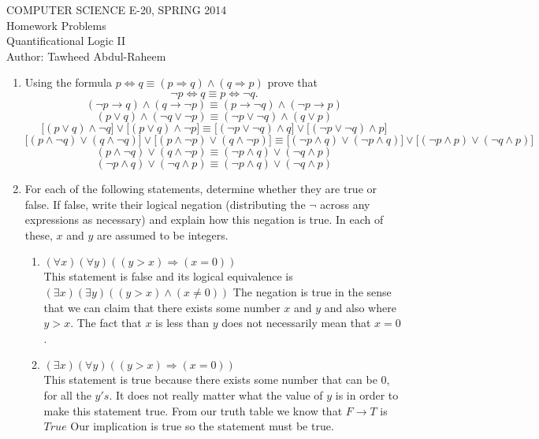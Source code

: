 \documentclass[12pt]{article}
\begin{document}
\begin{center}
COMPUTER SCIENCE E-20, SPRING 2014 \\
Homework Problems\\
Quantificational Logic II\\
Author: Tawheed Abdul-Raheem
\end{center}

\smallskip



\begin{enumerate}
\item Using the formula $p\Leftrightarrow q \equiv (p\Rightarrow q)\land (q\Rightarrow p)$ prove that $$\lnot p \Leftrightarrow q\equiv p\Leftrightarrow \lnot q.$$
        \[( \neg p \rightarrow q) \wedge (q \rightarrow \neg p) \equiv (p \rightarrow \neg q) \wedge (\neg p \rightarrow p) \]
        \[(p \vee q) \wedge (\neg q \vee \neg p) \equiv (\neg p \vee \neg q) \wedge (q \vee p) \]
        \[ \Big[ ( p \vee q) \wedge  \neg q \Big] \vee \Big[ (p \vee q) \wedge \neg p \Big] \equiv \Big[ (\neg p \vee \neg q) \wedge q \Big] \vee \Big[ (\neg p \vee \neg q) \wedge p \Big] \]
        \[ \Big[ ( p \wedge \neg q) \vee (q \wedge \neg q) \Big] \vee \Big[ (p \wedge \neg p) \vee (q \wedge \neg p) \Big] \equiv \Big[ (\neg p \wedge q) \vee (\neg p \wedge q) \Big] \vee \Big[ (\neg p \wedge p) \vee (\neg q \wedge p) \Big] \]
        \[(p \wedge \neg q) \vee (q \wedge \neg p) \equiv (\neg p \wedge q) \vee (\neg q \wedge p) \]
        \[(\neg p \wedge q) \vee (\neg q \wedge p)\equiv (\neg p \wedge q) \vee (\neg q \wedge p) \]
\item For each of the following statements, determine whether they are true or false. If false, write their logical negation (distributing the $\lnot$ across any expressions as necessary) and explain how this negation is true. In each of these, $x$ and $y$ are assumed to be integers.
\begin{enumerate}
\item $(\forall x)(\forall y) ((y>x) \Rightarrow (x=0))$ \\
This statement is false and its logical equivalence is $(\exists x )(\exists y)((y > x) \wedge (x \neq 0))$ The negation is true in the sense that we can claim that there exists some number $x$ and $y$ and also where $y> x$. The fact that $x$ is less than $y$ does not necessarily mean that $x = 0$.
\item $(\exists x) (\forall y) ((y>x) \Rightarrow (x=0))$ \\
This statement is true because there exists some number that can be $0$, for all the $y's$. It does not really matter what the value of $y$ is in order to make this statement true. From our truth table we know that $F \rightarrow T$ is $True$ Our implication is true so the statement must be true.

\end{enumerate}
\end{enumerate}
\end{document}
